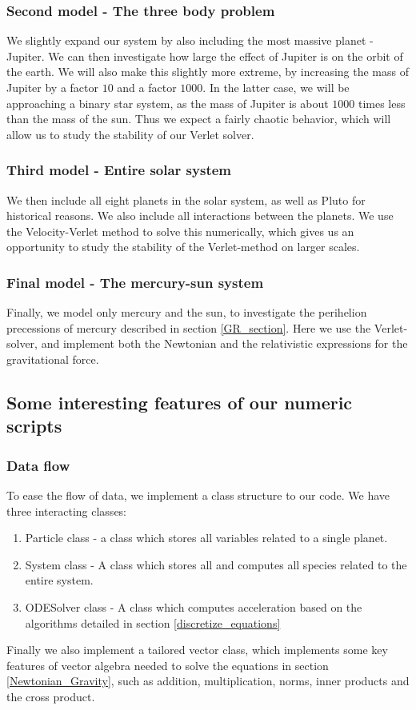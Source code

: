 \documentclass[a4paper, 10pt]{article}
\begin{document}
\subsubsection{Second model - The three body problem}
We slightly expand our system by also including the most massive planet - Jupiter. We can then investigate how large the effect of Jupiter is on the orbit of the earth. We will also make this slightly more extreme, by increasing the mass of Jupiter by a factor $10$ and a factor $1000$. In the latter case, we will be approaching a binary star system, as the mass of Jupiter is about $1000$ times less than the mass of the sun. Thus we expect a fairly chaotic behavior, which will allow us to study the stability of our Verlet solver.
\subsubsection{Third model - Entire solar system}
We then include all eight planets in the solar system, as well as Pluto for historical reasons. We also include all interactions between the planets. We use the Velocity-Verlet method to solve this numerically, which gives us an opportunity to study the stability of the Verlet-method on larger scales.
\subsubsection{Final model - The mercury-sun system}
Finally, we model only mercury and the sun, to investigate the perihelion precessions of mercury described in section \ref{GR_section}. Here we use the Verlet-solver, and implement both the Newtonian and the relativistic expressions for the gravitational force.
\subsection{Some interesting features of our numeric scripts}
\subsubsection{Data flow}
To ease the flow of data, we implement a class structure to our code. We have three interacting classes:
\begin{enumerate}
\item Particle class - a class which stores all variables related to a single planet.
\item System class - A class which stores all and computes all species related to the entire system.
\item ODESolver class - A class which computes acceleration based on the algorithms detailed in section \ref{discretize_equations}
\end{enumerate}
Finally we also implement a tailored vector class, which implements some key features of vector algebra needed to solve the equations in section \ref{Newtonian_Gravity}, such as addition, multiplication, norms, inner products and the cross product.
\end{document}
